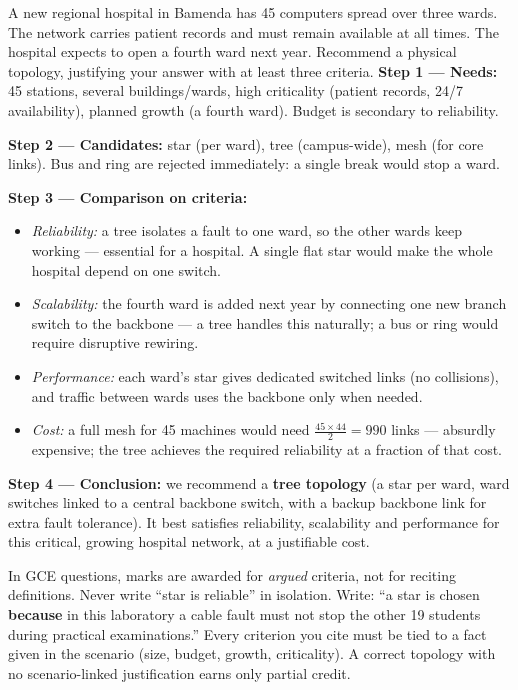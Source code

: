 \documentclass[11pt]{article}
\begin{document}
\begin{exoresolu}
A new regional hospital in Bamenda has 45 computers spread over three wards. The network carries patient records and must remain available at all times. The hospital expects to open a fourth ward next year. Recommend a physical topology, justifying your answer with at least three criteria.
\tcblower
\textbf{Step 1 --- Needs:} 45 stations, several buildings/wards, high criticality (patient records, 24/7 availability), planned growth (a fourth ward). Budget is secondary to reliability.\par
\textbf{Step 2 --- Candidates:} star (per ward), tree (campus-wide), mesh (for core links). Bus and ring are rejected immediately: a single break would stop a ward.\par
\textbf{Step 3 --- Comparison on criteria:}
\begin{itemize}
\item \emph{Reliability:} a tree isolates a fault to one ward, so the other wards keep working --- essential for a hospital. A single flat star would make the whole hospital depend on one switch.
\item \emph{Scalability:} the fourth ward is added next year by connecting one new branch switch to the backbone --- a tree handles this naturally; a bus or ring would require disruptive rewiring.
\item \emph{Performance:} each ward's star gives dedicated switched links (no collisions), and traffic between wards uses the backbone only when needed.
\item \emph{Cost:} a full mesh for 45 machines would need $\frac{45\times 44}{2}=990$ links --- absurdly expensive; the tree achieves the required reliability at a fraction of that cost.
\end{itemize}
\textbf{Step 4 --- Conclusion:} we recommend a \textbf{tree topology} (a star per ward, ward switches linked to a central backbone switch, with a backup backbone link for extra fault tolerance). It best satisfies reliability, scalability and performance for this critical, growing hospital network, at a justifiable cost.
\end{exoresolu}

\begin{attention}
In GCE questions, marks are awarded for \emph{argued} criteria, not for reciting definitions. Never write ``star is reliable'' in isolation. Write: ``a star is chosen \textbf{because} in this laboratory a cable fault must not stop the other 19 students during practical examinations.'' Every criterion you cite must be tied to a fact given in the scenario (size, budget, growth, criticality). A correct topology with no scenario-linked justification earns only partial credit.
\end{attention}
\end{document}
